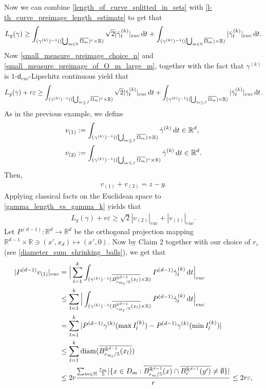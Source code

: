 \documentclass[a4paper,10pt]{article}
\numberwithin{equation}{section}
\newcommand{\R}{\mathbb{R}}
\newcommand{\N}{\mathbb{N}}
\newcommand{\e}{\varepsilon}
\newcommand{\diam}{\mathrm{diam}}
\newcommand{\sfd}{\mathsf d}
\newcommand{\di}{{\rm d}}
\begin{document}
Now we can combine \eqref{length_of_curve_splitted_in_sets} with \eqref{l-th_curve_preimage_length_estimate} to get that 
\begin{align*}
    L_g(\gamma) \geq \int_{(\gamma^{(k)})^{-1}((\bigcup_{m\in \N}\overline{\Omega_m})^c\times \R)} \sqrt{2}|\dot{\gamma}^{(k)}_t|_{euc} \, \di t + \int_{(\gamma^{(k)})^{-1}((\bigcup_{m\in \N}\overline{\Omega_m})\times \R)} |\dot{\gamma}^{(k)}_t|_{euc} \, \di t.
\end{align*}
Now \eqref{small_measure_preimage_choice_n} and \eqref{small_measure_preimage_of_O_m_large_m}, together with the fact that $\gamma^{(k)}$ is $1$-$\sfd_{euc}$-Lipschitz continuous yield that 
\begin{align}\label{gamma_length_vs_gamma_k}
    L_g(\gamma) + r\e \geq \int_{(\gamma^{(k)})^{-1}((\bigcup_{m\leq J}\overline{\Omega_m})^c\times \R)} \sqrt{2}|\dot{\gamma}^{(k)}_t|_{euc} \, \di t + \int_{(\gamma^{(k)})^{-1}((\bigcup_{m\leq J}\overline{\Omega_m})\times \R)} |\dot{\gamma}^{(k)}_t|_{euc} \, \di t.
\end{align}
As in the previous example, we define
\begin{align*}
    &v_{(1)}:= \int_{(\gamma^{(k)})^{-1}((\bigcup_{m\leq J}\overline{\Omega_m})\times \R)}\dot{\gamma}^{(k)} \, \di t \in \R^d,\\
    &v_{(2)}:= \int_{(\gamma^{(k)})^{-1}((\bigcup_{m\leq J}\overline{\Omega_m})^c\times \R)}\dot{\gamma}^{(k)} \, \di t \in \R^d.
\end{align*}
Then, 
\begin{align*}
    v_{(1)}+v_{(2)} = z-y.
\end{align*}
Applying classical facts on the Euclidean space to \eqref{gamma_length_vs_gamma_k} yields that 
\begin{align}\label{length_gamma_vs_two_straight_linea_a}
    L_g(\gamma) + r\e \geq \sqrt{2}|v_{(2)}|_{euc} + |v_{(1)}|_{euc}. 
\end{align}
Let $P^{(d-1)}: \R^d \to \R^d$ be the orthogonal projection mapping $\R^{d-1} \times \R\ni (x', x_d) \mapsto (x', 0)$. 
Now by Claim 2 together with our choice of $r_\e$ (see \eqref{diameter_sum_shrinking_balls}), we get that 
\begin{align}\label{pv_1_short_in_first_d-1_dimensions}
    |P^{(d-1)} v_{(1)}|_{euc} &= \Big|\sum_{l=1}^k \int_{(\gamma^{(k)})^{-1}(\overline{B^{\R^{d-1}}_{r_{m_l}/5}(x_l)}\times \R)} P^{(d-1)}\dot{\gamma}^{(k)}_t \, \di t \Big|_{euc} \nonumber \\
    &\leq \sum_{l=1}^k \Big|\int_{(\gamma^{(k)})^{-1}(\overline{B^{\R^{d-1}}_{r_{m_l}/5}(x_l)}\times \R)} P^{(d-1)}\dot{\gamma}^{(k)}_t \, \di t \Big|_{euc} \nonumber \\
    &= \sum_{l=1}^k |P^{(d-1)}\gamma^{(k)}(\max I^{(k)}_l)-P^{(d-1)}\gamma^{(k)}(\min I^{(k)}_l)| \nonumber \\
    &\leq \sum_{l=1}^k \diam(\overline{B^{\R^{d-1}}_{r_{m_l}/5}(x_l)}) \nonumber \\
    & \leq 2r \frac{\sum_{m \in \N}\frac{r_m}{5}|\{x \in D_m: \overline{B^{\R^{d-1}}_{r_m/5}(x)} \cap \overline{B^{\R^{d-1}}_r(y')}\neq \emptyset\}|}{r} \leq 2r\e,
\end{align}
\end{document}
